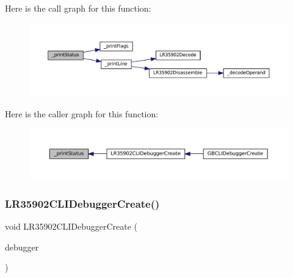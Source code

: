 Here is the call graph for this function\+:
\nopagebreak
\begin{figure}[H]
\begin{center}
\leavevmode
\includegraphics[width=350pt]{lr35902_2debugger_2cli-debugger_8c_a1bce4490785068fd42fca65db1fb21ad_cgraph}
\end{center}
\end{figure}
Here is the caller graph for this function\+:
\nopagebreak
\begin{figure}[H]
\begin{center}
\leavevmode
\includegraphics[width=350pt]{lr35902_2debugger_2cli-debugger_8c_a1bce4490785068fd42fca65db1fb21ad_icgraph}
\end{center}
\end{figure}
\mbox{\label{lr35902_2debugger_2cli-debugger_8c_ac552e15579f9549416a7d86250b83460}} 
\subsubsection{\texorpdfstring{L\+R35902\+C\+L\+I\+Debugger\+Create()}{LR35902CLIDebuggerCreate()}}
{\footnotesize\ttfamily void L\+R35902\+C\+L\+I\+Debugger\+Create (\begin{DoxyParamCaption}\item[{struct C\+L\+I\+Debugger\+System $\ast$}]{debugger }\end{DoxyParamCaption})}

